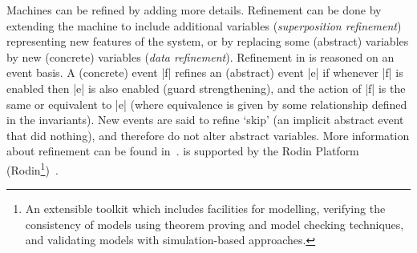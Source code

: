 Machines can be refined by adding more details.  Refinement can be done by extending the machine 
to include additional variables (\emph{superposition refinement}) representing new features of 
the system, or by replacing some (abstract) variables by new (concrete) variables (\emph{data refinement}).  
Refinement in \EventB is reasoned on an event basis.  
A (concrete) event |f| refines an (abstract) event |e| if whenever |f| is enabled then |e| is also enabled (guard strengthening), and the action of |f| is the same or equivalent to |e| (where equivalence is given by some relationship defined in the invariants). 
New events are said to refine `skip' (an implicit abstract event that did nothing), and therefore do not alter abstract variables.
 More information about \EventB refinement can be
found in~\cite{abrial10:_model_event_b}.
\EventB is supported by the Rodin Platform (Rodin\footnote{An extensible toolkit which includes 
facilities for modelling, verifying the consistency of models using theorem proving and model 
checking techniques, and validating models with simulation-based approaches.})~\cite{abrial10:_rodin}.

